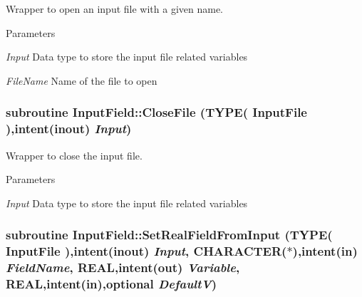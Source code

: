 Wrapper to open an input file with a given name. 
\begin{DoxyParams}{Parameters}
\item[{\em Input}]Data type to store the input file related variables \item[{\em FileName}]Name of the file to open \end{DoxyParams}
\hypertarget{namespace_input_field_a2ff58fb6ffd3fe11782567af59bc26fa}{
\subsubsection[{CloseFile}]{\setlength{\rightskip}{0pt plus 5cm}subroutine InputField::CloseFile (TYPE( InputFile ),intent(inout) {\em Input})}}
\label{namespace_input_field_a2ff58fb6ffd3fe11782567af59bc26fa}


Wrapper to close the input file. 
\begin{DoxyParams}{Parameters}
\item[{\em Input}]Data type to store the input file related variables \end{DoxyParams}
\hypertarget{namespace_input_field_adc129418985de962f55e62964277411d}{
\subsubsection[{SetRealFieldFromInput}]{\setlength{\rightskip}{0pt plus 5cm}subroutine InputField::SetRealFieldFromInput (TYPE( InputFile ),intent(inout) {\em Input}, \/  CHARACTER($\ast$),intent(in) {\em FieldName}, \/  REAL,intent(out) {\em Variable}, \/  REAL,intent(in),optional {\em DefaultV})}}
\label{namespace_input_field_adc129418985de962f55e62964277411d}



